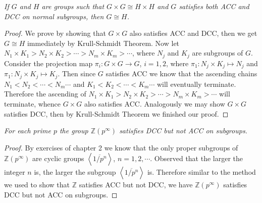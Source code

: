 \begin{problem}\em
If $G$ and $H$ are groups such that $G\times G\cong H\times H$ and $G$ satisfies both ACC and DCC on normal subgroups, then $G\cong H$.
\end{problem}
\begin{proof}
We prove by showing that $G\times G$ also satisfies ACC and DCC, then we get $G\cong H$ immediately by Krull-Schmidt Theorem. Now let $N_1\times K_1>N_2\times K_2>\cdots>N_m\times K_m>\cdots$, where $N_j$ and $K_j$ are subgroups of $G$. Consider the projection map $\pi_i:G\times G\to G$, $i=1,2$, where $\pi_1:N_j\times K_j\mapsto N_j$ and $\pi_1:N_j\times K_j\mapsto K_j$. Then since $G$ satisfies ACC we know that the ascending chains $N_1<N_2<\cdots<N_m\cdots$ and $K_1<K_2<\cdots<K_m\cdots$ will eventually terminate. Therefore the ascending of $N_1\times K_1>N_2\times K_2>\cdots>N_m\times K_m>\cdots$ will terminate, whence $G\times G$ also satisfies ACC. Analogously we may show $G\times G$ satisfies DCC, then by Krull-Schmidt Theorem we finished our proof.
\end{proof}
\begin{problem}\em
For each prime $p$ the group $\mathbb{Z}(p^\infty)$ satisfies DCC but not ACC on subgroups.
\end{problem}
\begin{proof}
By exercises of chapter 2 we know that the only proper subgroups of $\mathbb{Z}(p^\infty)$ are cyclic groups $\left<\overline{1/p^n}\right>$, $n=1,2,\cdots$. Observed that the larger the integer $n$ is, the larger the subgroup $\left<\overline{1/p^n}\right>$ is. Therefore similar to the method we used to show that $\mathbb{Z}$ satisfies ACC but not DCC, we have $\mathbb{Z}(p^\infty)$ satisfies DCC but not ACC on subgroups.
\end{proof}
